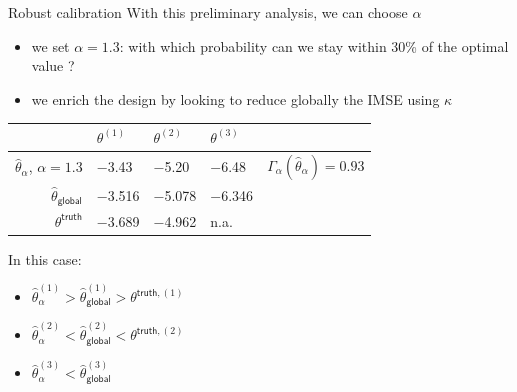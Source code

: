 \documentclass[10pt,aspectratio=169,usepdftitle=false]{beamer}
\newcommand{\kk}{\theta}
\begin{document}
\begin{frame}{Robust calibration}
  With this preliminary analysis, we can choose $\alpha$
  \begin{itemize}
  \item we set $\alpha=1.3$: with which probability can we stay within 30\% of the optimal value ?
  \item we enrich the design by looking to reduce globally the IMSE using $\kappa$
  \end{itemize}
  \begin{center}
    \begin{tabular}{rllll}
      \toprule
       & $\kk^{(1)}$ &$\kk^{(2)}$ & $\kk^{(3)}$ & \\ \midrule
     $\hat{\kk}_{\alpha}$, $\alpha=1.3$ & \num{-3.43} & \num{-5.20} &\num{-6.48}&$\Gamma_{\alpha}(\hat{\kk}_{\alpha})=\num{0.93}$  \\
    $\hat{\kk}_{\mathsf{global}}$ & \num{-3.516} & \num{-5.078} & \num{-6.346} &\\
      ${\kk}^{\mathsf{truth}}$ & \num{-3.689} & \num{-4.962}& {n.a.} &\\
    \bottomrule
  \end{tabular}
\end{center}
  In this case:
\begin{itemize}
\item $\hat{\kk}_{\alpha}^{(1)}> \hat{\kk}_{\mathsf{global}}^{(1)} > \kk^{\mathsf{truth}, (1)}$
\item $\hat{\kk}_{\alpha}^{(2)} < \hat{\kk}_{\mathsf{global}}^{(2)} < \kk^{\mathsf{truth}, (2)}$
\item $\hat{\kk}^{(3)}_{\alpha}< \hat{\kk}_{\mathsf{global}}^{(3)}$
\end{itemize}
\end{frame}
\end{document}
